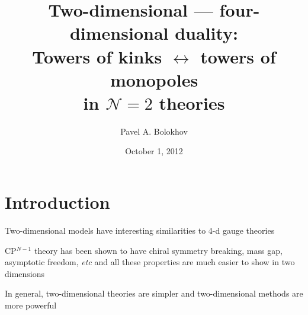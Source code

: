 \documentclass{beamer}
\title[Two-dim. --- four-dim. duality]
      {Two-dimensional --- four-dimensional duality:\\
	Towers of kinks $\leftrightarrow$ towers of monopoles\\ 
		in $\mathcal{N}=2$ theories}
\author{Pavel A. Bolokhov}
\date{October 1, 2012}
\institute[UMN \& SPbSU]{University of Minnesota ~~$\cdot$~~ St.Petersburg State University}
\begin{document}
\maketitle

\section{Introduction}


\begin{frame}{}


	Two-dimensional models have interesting similarities to 4-d gauge theories
\vspace{0.4cm}

	CP$^{N-1}$ theory has been shown to have chiral symmetry breaking, mass gap,
	asymptotic freedom, {\it etc} and all these properties are much easier to show
	in two dimensions 
\vspace{0.4cm}

	In general, two-dimensional theories are simpler and two-dimensional methods
	are more powerful

\end{frame}
\end{document}

